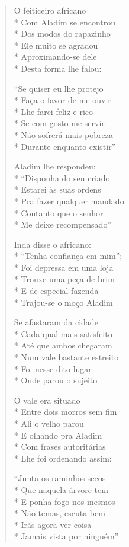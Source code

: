 \begin{verse}
O feiticeiro africano\\*
Com Aladim se encontrou\\*
Dos modos do rapazinho\\*
Ele muito se agradou\\*
Aproximando-se dele\\*
Desta forma lhe falou:

``Se quiser eu lhe protejo\\*
Faça o favor de me ouvir\\*
Lhe farei feliz e rico\\*
Se com gosto me servir\\*
Não sofrerá mais pobreza\\*
Durante enquanto existir''

Aladim lhe respondeu:\\*
``Disponha do seu criado\\*
Estarei às suas ordens\\*
Pra fazer qualquer mandado\\*
Contanto que o senhor\\*
Me deixe recompensado''

Inda disse o africano:\\*
``Tenha confiança em mim'';\\*
Foi depressa em uma loja\\*
Trouxe uma peça de brim\\*
E de especial fazenda\\*
Trajou-se o moço Aladim

Se afastaram da cidade\\*
Cada qual mais satisfeito\\*
Até que ambos chegaram\\*
Num vale bastante estreito\\*
Foi nesse dito lugar\\*
Onde parou o sujeito

O vale era situado\\*
Entre dois morros sem fim\\*
Ali o velho parou\\*
E olhando pra Aladim\\*
Com frases autoritárias\\*
Lhe foi ordenando assim:

``Junta os raminhos secos\\*
Que naquela árvore tem\\*
E ponha fogo nos mesmos\\*
Não temas, escuta bem\\*
Irás agora ver coisa\\*
Jamais vista por ninguém''


\end{verse}
